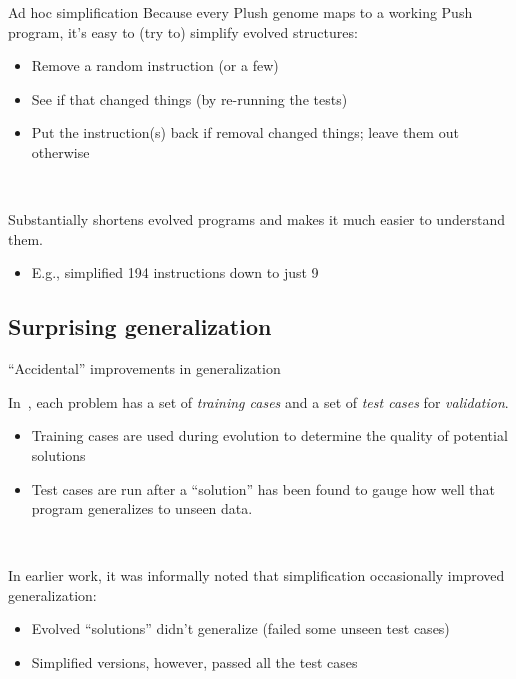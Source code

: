 \documentclass{beamer}
\begin{document}
\begin{frame}{Ad hoc simplification}
Because every Plush genome maps to a working Push program, it's easy to (try to) simplify evolved structures:
\begin{itemize}
	\item Remove a random instruction (or a few)
	\item See if that changed things (by re-running the tests)
	\item Put the instruction(s) back if removal changed things; leave them out otherwise
\end{itemize}
 
 ~
 
 Substantially shortens evolved programs and makes it much easier to
 understand them.
 \begin{itemize}
 	\item E.g., simplified 194 instructions down to just 9
 \end{itemize}
\end{frame}

\subsection{Surprising generalization}

\begin{frame}{``Accidental'' improvements in generalization}

In~\cite{benchmark}, each problem has a set of \emph{training cases} and a set of \emph{test cases} for \emph{validation}.
\begin{itemize}
	\item Training cases are used during evolution to determine the quality of potential solutions
	\item Test cases are run after a ``solution'' has been found to gauge how well that program generalizes to unseen data.
\end{itemize}

~

In earlier work, it was informally noted that simplification occasionally improved generalization:
\begin{itemize}
	\item Evolved ``solutions'' didn't generalize (failed some unseen test cases)
	\item Simplified versions, however, passed all the test cases
\end{itemize}

\end{frame}
\end{document}
